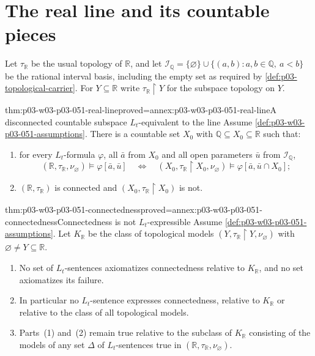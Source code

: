 \section{The real line and its countable pieces}
\label{sec:p03-w03-p03-051-real-line}

Let \(\tau_{\mathbb R}\) be the usual topology of \(\mathbb R\), and let
\(\mathcal I_{\mathbb Q}=\{\varnothing\}\cup
\{(a,b):a,b\in\mathbb Q,\ a<b\}\) be the rational interval basis,
including the empty set as required by \cref{def:p03-topological-carrier}. For \(Y\subseteq\mathbb R\) write
\(\tau_{\mathbb R}\restriction Y\) for the subspace topology on \(Y\).

\begin{hbtheorem}{thm:p03-w03-p03-051-real-line}{proved=annex:p03-w03-p03-051-real-line}{A disconnected countable subspace \(L_t\)-equivalent to the line}
Assume \cref{def:p03-w03-p03-051-assumptions}. There is a countable set
\(X_0\) with \(\mathbb Q\subseteq X_0\subseteq\mathbb R\) such that:
\begin{enumerate}
\item for every \(L_t\)-formula \(\varphi\), all \(\bar a\) from \(X_0\)
      and all open parameters \(\bar u\) from
      \(\mathcal I_{\mathbb Q}\),
      \[
       (\mathbb R,\tau_{\mathbb R},\nu_\varnothing)\models\varphi[\bar a,\bar u]
       \quad\Longleftrightarrow\quad
       (X_0,\tau_{\mathbb R}\restriction X_0,\nu_\varnothing)
         \models\varphi[\bar a,\bar u\cap X_0];
      \]
\item \((\mathbb R,\tau_{\mathbb R})\) is connected and
      \((X_0,\tau_{\mathbb R}\restriction X_0)\) is not.
\end{enumerate}
\end{hbtheorem}

\begin{hbtheorem}{thm:p03-w03-p03-051-connectedness}{proved=annex:p03-w03-p03-051-connectedness}{Connectedness is not \(L_t\)-expressible}
Assume \cref{def:p03-w03-p03-051-assumptions}. Let \(K_{\mathbb R}\) be the
class of topological models \((Y,\tau_{\mathbb R}\restriction
Y,\nu_\varnothing)\) with \(\varnothing\ne Y\subseteq\mathbb R\).
\begin{enumerate}
\item No set of \(L_t\)-sentences axiomatizes connectedness relative to
      \(K_{\mathbb R}\), and no set axiomatizes its failure.
\item In particular no \(L_t\)-sentence expresses connectedness, relative to
      \(K_{\mathbb R}\) or relative to the class of all topological models.
\item Parts~(1) and~(2) remain true relative to the subclass of
      \(K_{\mathbb R}\) consisting of the models of any set \(\Delta\) of
      \(L_t\)-sentences true in \((\mathbb R,\tau_{\mathbb R},\nu_\varnothing)\).
\end{enumerate}
\end{hbtheorem}

